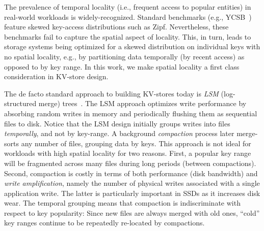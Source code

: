 The prevalence of temporal locality (i.e., frequent access to popular entities) in real-world workloads is widely-recognized.
Standard benchmarks (e.g., YCSB~\cite{YCSB})  feature skewed key-access distributions such as Zipf.
Nevertheless, 
these benchmarks fail to capture the spatial aspect of locality.
This, in turn, leads to storage systems being optimized for a skewed distribution on individual keys with no spatial locality,
e.g., by partitioning data temporally (by recent access) as opposed to by key range.
In this work, we make spatial locality a first class consideration in KV-store design.

The de facto standard approach to building KV-stores today is \emph{LSM} (log-structured merge) trees~\cite{DBLP:journals/acta/ONeilCGO96}. 
The LSM approach optimizes write performance by absorbing random writes in memory and periodically flushing 
them as sequential files to disk. %
Notice that the LSM design initially groups writes  into files \emph{temporally}, and not by key-range. 
A background \emph{compaction} process later merge-sorts any number of files, grouping data by keys. 
This approach is not ideal for workloads with high spatial locality for two reasons. 
First, a popular key range will be fragmented across many files during long periods (between compactions). 
Second,  compaction  is costly in terms of  both performance 
(disk bandwidth) and \emph{write amplification}, namely the number of physical writes 
associated with a single application write. The latter is  particularly important in SSDs as it increases disk wear. 
The temporal grouping means that compaction is indiscriminate with respect to key popularity:  
Since new files are always merged with old ones, 
 ``cold'' key ranges
 continue to be repeatedly re-located
by  compactions.  


